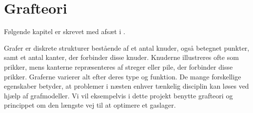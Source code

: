 \chapter{Grafteori}
Følgende kapitel er skrevet med afsæt i \citep{dmat}.

Grafer er diskrete strukturer bestående af et antal knuder, også betegnet punkter, samt et antal kanter, der forbinder disse knuder. Knuderne illustreres ofte som prikker, mens kanterne repræsenteres af streger eller pile, der forbinder disse prikker. Graferne varierer alt efter deres type og funktion. De mange forskellige egenskaber betyder, at problemer i næsten enhver tænkelig disciplin kan løses ved hjælp af grafmodeller. Vi vil eksempelvis i dette projekt benytte grafteori og princippet om den længste vej til at optimere et gaslager.




%
%










